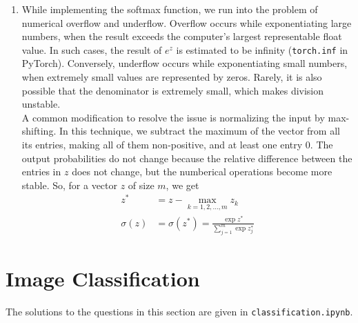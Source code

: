 \documentclass[10pt]{article}
\begin{document}
\begin{enumerate}[label=(\alph*)]
        \item While implementing the softmax function, we run into the problem of numerical overflow
        and underflow. Overflow occurs while exponentiating large numbers, when the result exceeds the
        computer's largest representable float value. In such cases, the result of $e^{z}$ is estimated to be
        infinity (\texttt{torch.inf} in PyTorch). Conversely, underflow occurs while exponentiating small
        numbers, when extremely small values are represented by zeros. Rarely, it is also possible
        that the denominator is extremely small, which makes division unstable. \\
        A common modification to resolve the issue is normalizing the input by max-shifting. In this
        technique, we subtract the maximum of the vector from all its entries, making all of them
        non-positive, and at least one entry 0. The output probabilities do not change because the relative
        difference between the entries in $z$ does not change, but the numberical
        operations become more stable. So, for a vector $z$ of size $m$, we get
        \begin{align*}
            z^{*} &= z - \max_{k = 1, 2, \dots, m}{z_{k}} \\
            \sigma(z) &= \sigma(z^{*}) = \frac{\exp{z^{*}}}{\sum_{j=1}^{m} \exp{z_{j}^{*}}}
        \end{align*}
    \end{enumerate}

    \section*{\textbf{Image Classification}}
    The solutions to the questions in this section are given in \texttt{classification.ipynb}.
\end{document}
